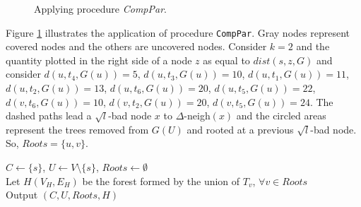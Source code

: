 \begin{figure}[t]
\caption[Applying procedure \emph{CompPar}]{Applying procedure \emph{CompPar}.} 
\label{fig:compPar}
\end{figure}

Figure \ref{fig:compPar} illustrates the application of procedure \verb|CompPar|. Gray nodes represent covered nodes and the others are uncovered nodes. 
Consider $k = 2$ and the quantity plotted in the right side of a node $z$ as equal to $dist(s,z,G)$ and consider 
$d(u,t_4,G(u)) = 5$, $d(u,t_3,G(u)) = 10$, $d(u,t_1,G(u)) = 11$, $d(u,t_2,G(u)) = 13$, $d(u,t_6,G(u)) = 20$, $d(u,t_5,G(u)) = 22$, 
$d(v,t_6,G(u)) = 10$, $d(v,t_2,G(u)) = 20$, $d(v,t_5,G(u)) = 24$. 
The dashed paths lead a $\sqrt{l}$-bad node $x$ to $\Delta$-neigh$(x)$ and the circled areas represent the trees removed 
from $G(U)$ and rooted at a previous $\sqrt{l}$-bad node. So, $Roots = \{ u,v \}$.



\begin{procedure}
\label{alg:compute_partition}
$C \gets \lbrace s \rbrace$, $U \gets V \setminus \lbrace s \rbrace$, $Roots \gets \emptyset$\\
Let $H(V_H,E_H)$ be the forest formed by the union of $T_v$, $\forall v \in Roots$\\
Output $(C,U,Roots, H)$
\caption{CompPar(G=(V, E), s, k)} 
\end{procedure}


